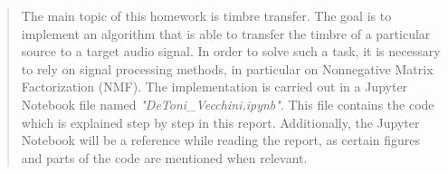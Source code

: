 
\begin{abstract}
    The main topic of this homework is timbre transfer. The goal is to implement an algorithm that is able to transfer the timbre of a particular source to a target audio signal. In order to solve such a task, it is necessary to rely on signal processing methods, in particular on Nonnegative Matrix Factorization (NMF). The implementation is carried out in a Jupyter Notebook file named \textit{"DeToni\_Vecchini.ipynb"}. This file contains the code which is explained step by step in this report. Additionally, the Jupyter Notebook will be a reference while reading the report, as certain figures and parts of the code are mentioned when relevant.
\end{abstract}
